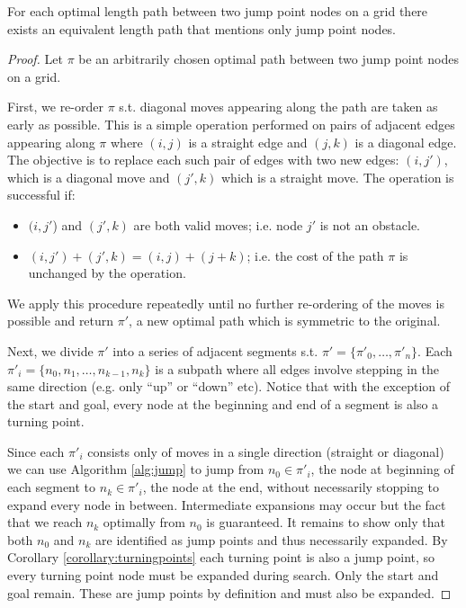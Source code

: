 \begin{lemma}
\label{lemma:jumping}
For each optimal length path between two jump point nodes on a grid there exists
an equivalent length path that mentions only jump point nodes.
\end{lemma}
\begin{proof}
Let $\pi$ be an arbitrarily chosen optimal path between two jump point nodes
on a grid.  
\par
First, we re-order $\pi$ s.t. diagonal moves appearing along the path are taken
as early as possible. This is a simple operation performed on pairs of adjacent
edges appearing along $\pi$ where $(i, j)$ is a straight edge and $(j, k)$ is a
diagonal edge.
The objective is to replace each such pair of edges with two new edges: 
$(i, j')$, which is a diagonal move and $(j', k)$ which is a straight move. 
The operation is successful if:
\begin{itemize}
\item $(i, j'$) and $(j', k)$ are both valid moves; i.e. node $j'$ is not an
obstacle.
\item $(i, j') + (j', k) = (i, j) + (j + k)$; i.e. the cost of
the path $\pi$ is unchanged by the operation.
\end{itemize}
We apply this procedure repeatedly until no further re-ordering of the moves
is possible and return $\pi'$, a new optimal path which is symmetric
to the original.
\par
Next, we divide $\pi'$ into a series of adjacent
segments s.t. $\pi' = \lbrace \pi'_{0}, \ldots, \pi'_{n} \rbrace$. Each $\pi'_{i} 
= \lbrace n_{0}, n_{1}, \ldots, n_{k-1}, n_{k} \rbrace$
is a subpath where all edges involve stepping in the same direction 
(e.g.  only ``up'' or ``down'' etc).  Notice that with the
exception of the start and goal, every node at the beginning and end of a
segment is also a turning point.
\par
Since each $\pi'_{i}$ consists only of moves in a single direction
(straight or diagonal) we can use Algorithm \ref{alg:jump} to jump from $n_{0}
\in \pi'_{i}$, the node at beginning of each segment to $n_{k} \in \pi'_{i}$, the
node at the end, without necessarily stopping to expand every node in between.
Intermediate expansions may occur but the fact that we reach $n_{k}$
optimally from $n_{0}$ is guaranteed.
It remains to show only that both $n_{0}$ and $n_{k}$ are identified as
jump points and thus necessarily expanded. 
By Corollary \ref{corollary:turningpoints} each turning point is 
also a jump point, so every turning point node must be expanded during search.
Only the start and goal remain. These are jump points by definition and must
also be expanded.
\end{proof}

